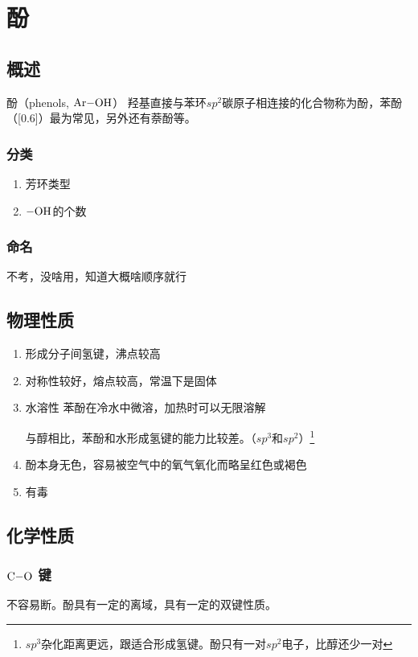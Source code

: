 \chapter{酚}
\section{概述}
酚（phenols, $\ce{Ar-OH}$）
羟基直接与苯环\textit{$sp^2$}碳原子相连接的化合物称为酚，苯酚（\scalebox{0.6}[0.6]{}）最为常见，另外还有萘酚等。

\subsection{分类}
\begin{enumerate}
    \item 芳环类型
    \item $\ce{-OH}$的个数
\end{enumerate}
\subsection{命名}
不考，没啥用，知道大概啥顺序就行

\section{物理性质}
\begin{enumerate}
    \item 形成分子间氢键，沸点较高
    \item 对称性较好，熔点较高，常温下是固体
    \item 水溶性 苯酚在冷水中微溶，加热时可以无限溶解 \par
    与醇相比，苯酚和水形成氢键的能力比较差。（$sp^3$和$sp^2$）\footnote{$sp^3$杂化距离更远，跟适合形成氢键。酚只有一对$sp^2$电子，比醇还少一对}
    \item 酚本身无色，容易被空气中的氧气氧化而略呈红色或褐色
    \item 有毒
\end{enumerate}

\section{化学性质}
\subsection{$\ce{C-O}$ 键}
不容易断。酚具有一定的离域，具有一定的双键性质。

